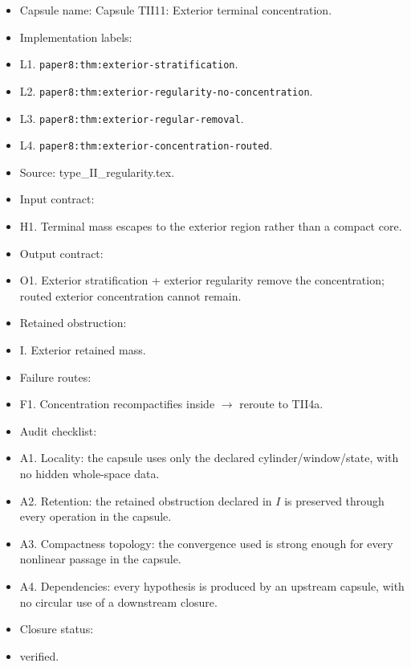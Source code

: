 \documentclass[11pt]{amsart}
\begin{document}
\begin{itemize}
  \item Capsule name: Capsule TII11: Exterior terminal concentration.
  \item Implementation labels:
  \item L1. \texttt{paper8:thm:exterior-stratification}.
  \item L2. \texttt{paper8:thm:exterior-regularity-no-concentration}.
  \item L3. \texttt{paper8:thm:exterior-regular-removal}.
  \item L4. \texttt{paper8:thm:exterior-concentration-routed}.
  \item Source: type\_II\_regularity.tex.
  \item Input contract:
  \item H1. Terminal mass escapes to the exterior region rather than a compact core.
  \item Output contract:
  \item O1. Exterior stratification + exterior regularity remove the concentration; routed exterior concentration cannot remain.
  \item Retained obstruction:
  \item I. Exterior retained mass.
  \item Failure routes:
  \item F1. Concentration recompactifies inside $\to$ reroute to TII4a.
  \item Audit checklist:
  \item A1. Locality: the capsule uses only the declared cylinder/window/state, with no hidden whole-space data.
  \item A2. Retention: the retained obstruction declared in $I$ is preserved through every operation in the capsule.
  \item A3. Compactness topology: the convergence used is strong enough for every nonlinear passage in the capsule.
  \item A4. Dependencies: every hypothesis is produced by an upstream capsule, with no circular use of a downstream closure.
  \item Closure status:
  \item verified.
\end{itemize}
\end{document}
